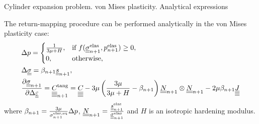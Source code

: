\documentclass[9pt]{beamer}
\begin{document}
\begin{frame}{Cylinder expansion problem. von Mises plasticity. Analytical expressions}

  The return-mapping procedure can be performed analytically in the von Mises plasticity case:
  \begin{align}
    & \Delta p = 
    \begin{cases}
        \frac{1}{3\mu + H}, & \text{if } f(\underline{\underline{\sigma}}^\text{elas}_{n+1}, p^\text{elas}_{n+1}) \geq 0,\\
        0, & \text{otherwise},
    \end{cases} \label{eqn:dp_von_mises}\\
    & \Delta\underline{\underline{\sigma}} = \beta_{n+1}\underline{\underline{s}}_{n+1}, \label{eqn:dsigma_von_mises} \\
    & \dfrac{\partial\underline{\underline{\sigma}}_{n+1}}{\partial\Delta\underline{\underline{\varepsilon}}} = \underline{\underline{\underline{\underline{C_{}}}}}_{n+1}^{\text{tang}} = \underline{\underline{\underline{\underline{C_{}}}}} - 3\mu \left( \frac{3\mu}{3\mu + H} -\beta_{n+1} \right) \underline{\underline{N}}_{n+1} \otimes \underline{\underline{N}}_{n+1} - 2\mu\beta_{n+1}\underline{\underline{\underline{\underline{J}}}} \label{eqn:C_tang_von_mises}
  \end{align}
  where $\beta_{n+1} = \frac{3\mu}{\sigma_{n+1}^\text{elas,eq}}\Delta p$, \quad $\underline{\underline{N}}_{n+1} = \frac{\underline{\underline{s}}^\text{elas}_{n+1}}{\underline{\underline{\sigma}}_{n+1}^{\text{elas}}}$ and $H$ is an isotropic hardening modulus.


\end{frame}
\end{document}
